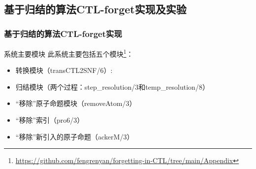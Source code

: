 \documentclass[9pt, CJK]{beamer}
\begin{document}
	\subsection{基于归结的算法CTL-forget实现及实验}
	
	\begin{frame}
		\frametitle{基于归结的算法CTL-forget实现}
		{\footnotesize
			\begin{block}{系统主要模块}
				此系统主要包括五个模块\footnote{ \url{https://github.com/fengrenyan/forgetting-in-CTL/tree/main/Appendix}}：
				\begin{itemize}
					\item 转换模块（transCTL2SNF/6）: 
					\item 归结模块（两个过程：step\_resolution/3和temp\_resolution/8）
					\item “移除”原子命题模块（removeAtom/3）
					\item “移除”索引（pro6/3）
					\item “移除”新引入的原子命题（ackerM/3）
				\end{itemize} 
			\end{block}
		}
	\end{frame}
	
\end{document}
